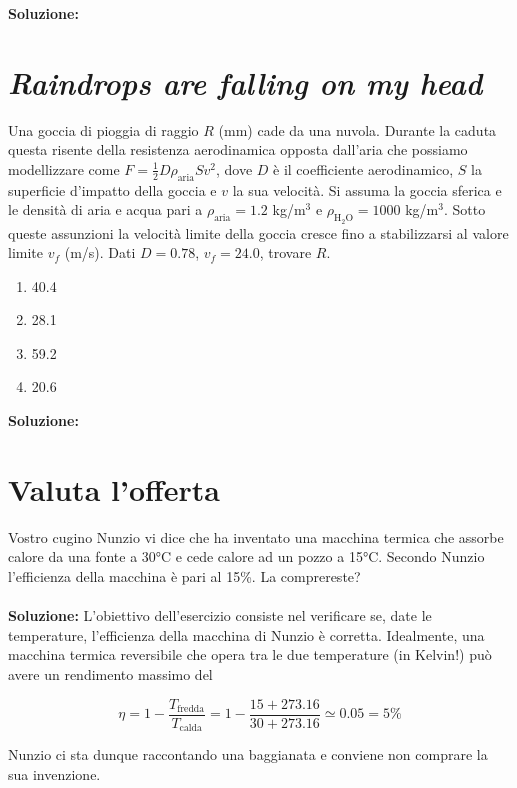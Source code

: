 \noindent \textbf{Soluzione:}


\section{\textit{Raindrops are falling on my head}}
Una goccia di pioggia di raggio $R$ (mm)
cade da una nuvola. Durante la caduta
questa risente della resistenza aerodinamica
opposta dall'aria che possiamo modellizzare
come $F = \frac12 D \rho_\text{aria} S v^2$,
dove $D$ è il coefficiente aerodinamico,
$S$ la superficie d'impatto della goccia e
$v$ la sua velocità. Si assuma la goccia
sferica e le densità di aria e acqua pari a
$\rho_\text{aria} = 1.2$ kg/m$^3$ e
$\rho_\text{H$_2$O} = 1000$ kg/m$^3$. Sotto
queste assunzioni la velocità limite della
goccia cresce fino a stabilizzarsi al
valore limite $v_f$ (m/s). Dati $D = 0.78$,
$v_f = 24.0$, trovare $R$.

\begin{enumerate}
    \item 40.4
    \item 28.1
    \item 59.2
    \item 20.6
\end{enumerate}

\noindent \textbf{Soluzione:}

\section{Valuta l'offerta}
Vostro cugino Nunzio vi dice che ha inventato una macchina termica che assorbe
calore da una fonte a 30°C e cede calore ad un pozzo a 15°C. Secondo Nunzio
l'efficienza della macchina è pari al 15\%. La comprereste?
\\\\
\noindent \textbf{Soluzione:} L'obiettivo dell'esercizio consiste
nel verificare se, date le temperature, l'efficienza della macchina
di Nunzio è corretta. Idealmente, una macchina termica reversibile che opera
tra le due temperature (in Kelvin!) può avere un rendimento massimo del

\[ \eta = 1 - \frac{T_\text{fredda}}{T_\text{calda}} = 1 - \frac{15 + 273.16}{30 + 273.16} \simeq 0.05 = 5\% \]

\noindent Nunzio ci sta dunque raccontando una baggianata e conviene non comprare la sua
invenzione.